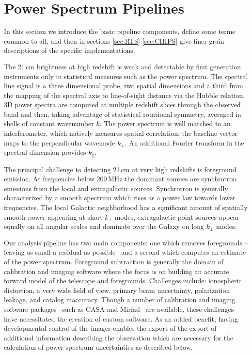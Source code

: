 \documentclass[twolcolumn,iop]{emulateapj}
\begin{document}
\section{Power Spectrum Pipelines}
\label{sec:pipelines}
In this section we introduce the basic pipeline components, define some terms common to all, and then in sections \ref{sec:RTS}-\ref{sec:CHIPS} give finer grain descriptions of the specific implementations.

The 21\,cm brightness at high redshift is weak and detectable by first generation instruments only in	 statistical measures such as the power spectrum. The spectral line signal is a three dimensional probe, two spatial dimensions and a third from the mapping of the spectral axis to line-of-sight distance via the Hubble relation. 3D power spectra are computed at multiple redshift slices through the observed band and then, taking advantage of statistical rotational symmetry, averaged in shells of constant wavenumber $k$.  The power spectrum is well matched to an interferometer, which natively measures spatial correlation; the baseline vector maps to the perpendicular wavemode $k_\perp$.  An additional Fourier transform in the spectral dimension provides $k_\parallel$.  

The principal challenge to detecting 21\,cm at very high redshifts is foreground emission. At frequencies below 200\,MHz the dominant sources are synchrotron emissions from the local and extragalactic sources. Synchrotron is generally characterized by a smooth spectrum which rises as a power law towards lower frequencies. The local Galactic neighborhood has a significant amount of spatially smooth power appearing at short $k_\perp$ modes, extragalactic point sources appear equally on all angular scales and dominate over the Galaxy on long $k_\perp$ modes.

Our analysis pipeline has two main components: one which removes foregrounds --leaving as small a residual as possible-- and a second which computes an estimate of the power spectrum.   Foreground subtraction is generally the domain of calibration and imaging software where the focus is on building an accurate forward model of the telescope and foregrounds.  Challenges include: ionospheric distortion, a very wide field of view, primary beam uncertainty, polarization leakage, and catalog inaccuracy. Though a number of calibration and imaging software packages --such as CASA and Miriad-- are available, these challenges have necessitated the creation of custom software.  As an added benefit, having developmental control of the imager enables the export of the export of additional information describing the observation which are necessary for the calculation of power spectrum uncertainties as described below. 
\end{document}
